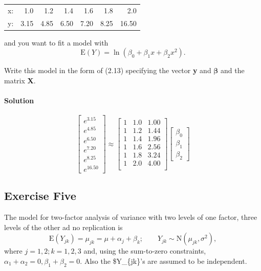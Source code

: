 \documentclass[]{article}
\let\oldparagraph\paragraph
\renewcommand{\paragraph}[1]{\oldparagraph{#1}\mbox{}}
\begin{document}
\begin{center}
\begin{tabular}{lrrrrrr}
\hline
x: & 1.0  & 1.2  & 1.4  & 1.6  & 1.8  & 2.0   \\
y: & 3.15 & 4.85 & 6.50 & 7.20 & 8.25 & 16.50 \\ \hline
\end{tabular}
\end{center}

and you want to fit a model with \[
  \text{E}(Y) = \ln(\beta_0 + \beta_1x + \beta_2x^2).
  \]

Write this model in the form of (2.13) specifying the vector \textbf{y}
and \(\mathbf{\beta}\) and the matrix \textbf{X}.

\paragraph{Solution}\label{solution-2}

\[\begin{bmatrix}
e^{3.15}\\e^{4.85}\\e^{6.50}\\e^{7.20}\\e^{8.25}\\e^{16.50}
\end{bmatrix} \approx \begin{bmatrix}
1 & 1.0 & 1.00\\
1 & 1.2 & 1.44\\
1 & 1.4 & 1.96\\
1 & 1.6 & 2.56\\
1 & 1.8 & 3.24\\
1 & 2.0 & 4.00\\
\end{bmatrix}\begin{bmatrix}
\beta_0\\
\beta_1\\
\beta_2
\end{bmatrix}
\]

\subsection{Exercise Five}\label{exercise-five}

The model for two-factor analysis of variance with two levels of one
factor, three levels of the other ad no replication is \[
  \text{E}(Y_{jk}) = \mu_{jk} = \mu + \alpha_j + \beta_{k}; \quad \quad Y_{jk} \sim \text{N}(\mu_{jk}, \sigma^2),
  \] where \(j = 1,2; k = 1,2,3\) and, using the sum-to-zero
constraints, \(\alpha_1 + \alpha_2 = 0, \beta_1 + \beta_2 = 0\). Also
the \$Y\_\{jk\}'s are assumed to be independent.
\end{document}
